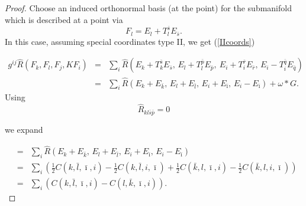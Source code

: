 \documentclass[12pt,letterpaper]{amsart}%
\numberwithin{mycounter}{section}
\theoremstyle{plain}
\numberwithin{equation}{section}
\theoremstyle{definition}
\begin{document}
\begin{proof}

Choose an induced orthonormal basis (at the point) for the submanifold
which is described at a point via 
\begin{equation*}
F_{l}=E_{l}+T_{l}^{\bar{s}}E_{\bar{s}}.
\end{equation*}%
In this case, assuming special coordinates type II, we get (\ref{IIcoords})



\begin{eqnarray*}
g^{ij}\hat{R}(F_{k},F_{l},F_{j},KF_{i})
&=& \sum_{i} \hat{R}\!\left(
E_{k}+T_{k}^{\bar{s}}E_{\bar{s}},\,
E_{l}+T_{l}^{\bar{p}}E_{\bar{p}},\
E_{i}+T_{i}^{\bar{r}}E_{\bar{r}},\,
E_{i}-T_{i}^{\bar{q}}E_{\bar{q}}
\right)
\\
&=& \sum_{i} \hat{R}\!\left(
E_{k}+E_{\bar{k}},\,
E_{l}+E_{\bar{l}},\,
E_{i}+E_{\bar{\imath}},\,
E_{i}-E_{\bar{\imath}}
\right)
+ \omega \ast G.
\end{eqnarray*}
Using  
\begin{equation*}
\hat{R}_{kl\bar{s}\bar{p}}=0
\end{equation*}

we expand 

\begin{eqnarray*}
&=& \sum_{i} \hat{R}\!\left(
E_{k}+E_{\bar{k}},\,
E_{l}+E_{\bar{l}},\,
E_{i}+E_{\bar{\imath}},\,
E_{i}-E_{\bar{\imath}}
\right)
\\
&=& \sum_{i}\left(
\frac{1}{2}C(k,\bar{l},\bar{\imath},i)
-\frac{1}{2}C(k,\bar{l},i,\bar{\imath})
+\frac{1}{2}C(\bar{k},l,\bar{\imath},i)
-\frac{1}{2}C(\bar{k},l,i,\bar{\imath})
\right)
\\
&=& \sum_{i}\left(
C(k,\bar{l},\bar{\imath},i)
-
C(l,\bar{k},\bar{\imath},i)
\right).
\end{eqnarray*}



\end{proof}
\end{document}
